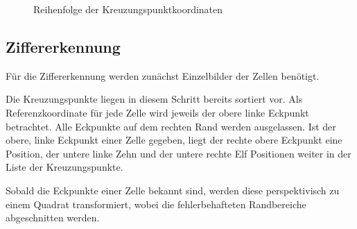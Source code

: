 \begin{figure}[H]
    \hfill
    \caption{Reihenfolge der Kreuzungspunktkoordinaten}
\end{figure}


\subsection{Ziffererkennung}
Für die Ziffererkennung werden zunächst Einzelbilder der Zellen benötigt.

Die Kreuzungspunkte liegen in diesem Schritt bereits sortiert vor.
Als Referenzkoordinate für jede Zelle wird jeweils der obere linke Eckpunkt betrachtet. Alle Eckpunkte auf dem rechten Rand werden ausgelassen.
Ist der obere, linke Eckpunkt einer Zelle gegeben, liegt der rechte obere Eckpunkt eine Position, der untere linke Zehn und der untere rechte Elf Positionen weiter in der Liste der Kreuzungspunkte.

Sobald die Eckpunkte einer Zelle bekannt sind, werden diese perspektivisch zu einem Quadrat transformiert, wobei die fehlerbehafteten Randbereiche abgeschnitten werden.

